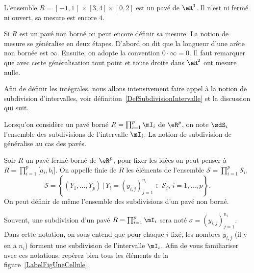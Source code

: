 \begin{example}
	L'ensemble \( R=\mathopen] -1 , 1 \mathclose[\times[3,4]\times[0,2]\) est un pavé de \( \eR^3\). Il n'est ni fermé ni ouvert, sa mesure est encore \( 4\).
\end{example}

Si \( R\) est un pavé non borné on peut encore définir sa mesure. La notion de mesure se généralise en deux étapes. D'abord on dit que la longueur d'une arête non bornée est \( \infty\). Ensuite, on adopte la convention \( 0\cdot \infty=0\). Il faut remarquer que avec cette généralisation tout point et toute droite dans \( \eR^2\) ont mesure nulle.

Afin de définir les intégrales, nous allons intensivement faire appel à la notion de subdivision d'intervalles, voir définition~\ref{DefSubdivisionIntervalle} et la discussion qui suit.

Lorsqu'on considère un pavé borné \( R=\prod_{i=1}^p\mI_i\) de \( \eR^p\), on note \( \sdS_i\) l'ensemble des subdivisions de l'intervalle \( \mI_i\). La notion de subdivision de généralise au cas des pavés.
\begin{definition}
	Soir \( R\) un pavé fermé borné de \( \eR^p\), pour fixer les idées on peut penser à \( R=\prod_{i=1}^p\mathopen[ a_i , b_i \mathclose]\). On appelle  finie de \( R\) les éléments de l'ensemble \( \mathcal{S}=\prod_{i=1}^{p}\mathcal{S}_i\),
	\[
		\mathcal{S}=\left\{ (Y_{1},\ldots, Y_{p})\,\big\vert\, Y_{i}=(y_{i,j})_{j=1}^{n_i}\in\mathcal{S}_i,\, i=1,\ldots,p\right\}.
	\]
	On peut définir de même l'ensemble des subdivisions d'un pavé non borné.
\end{definition}
Souvent, une subdivision d'un pavé \( R=\prod_{i=1}^p\mI_i\) sera noté \( \sigma=(y_{i,j})_{j=1}^{n_i}\). Dans cette notation, on sous-entend que pour chaque \( i\) fixé, les nombres \( y_{i,j}\) (il y en a \( n_i\)) forment une subdivision de l'intervalle \( \mI_i\). Afin de vous familiariser avec ces notations, repérez bien tous les éléments de la figure~\ref{LabelFigUneCellule}.
\newcommand{\CaptionFigUneCellule}{Une cellule d'une subdivision d'un pavé de \( \eR^2\). La cellule grisée est \( R_{(4,2)}\).}



